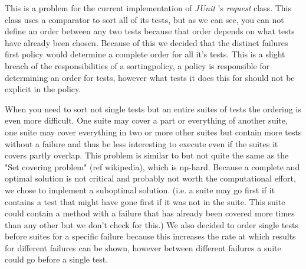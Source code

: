 \documentclass[i2]{oss}
\newcommand{\class}[1]{\emph{#1}}
\newcommand{\junit}{\emph{JUnit }}
\begin{document}
This is a problem for the current implementation of \junit's 
\class{request} class.
This class uses a comparator to sort all of its tests, but as we can 
see, you can not define an order between any two tests because that 
order depends on what tests have already been chosen.
Because of this we decided that the distinct failures first policy would
determine a complete order for all it's tests.
This is a slight breach of the responsibilities of a sortingpolicy,
a policy is responsible for determining an order for tests,
however what tests it does this for should not be explicit in the 
policy.

When you need to sort not single tests but an entire suites of tests the 
ordering is even more difficult.
One suite may cover a part or everything of another suite, one suite 
may cover everything in two or more other suites but contain more tests 
without a failure and thus be less interesting to execute even if the 
suites it covers partly overlap.
This problem is similar to but not quite the same as the
"Set covering problem" (ref wikipedia), which is np-hard.
Because a complete and optimal solution is not critical and probably 
not worth the computational effort, we chose to implement a suboptimal 
solution. (i.e. a suite may go first if it contains a test that might 
have gone first if it was not in the suite. This suite could contain a 
method with a failure that has already been covered more times than any 
other but we don't check for this.)
We also decided to order single tests before suites for a specific 
failure because this increases the rate at which results for different 
failures can be shown, however between different failures a suite could 
go before a single test.
\end{document}
